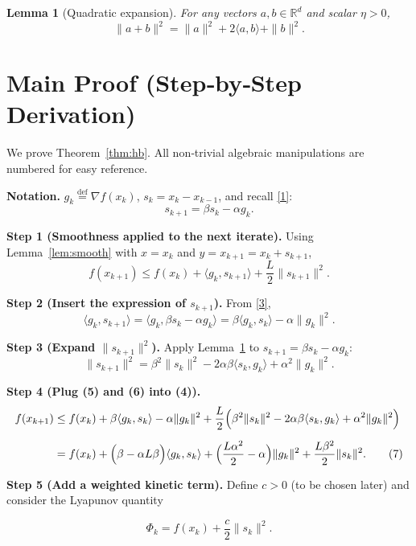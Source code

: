 \documentclass{article}
\newtheorem{lemma}{Lemma}
\newcommand{\R}{\mathbb{R}}
\begin{document}
\begin{lemma}[Quadratic expansion]\label{lem:expansion}
For any vectors $a,b\in\R^{d}$ and scalar $\eta>0$,
\[
\|a+b\|^{2}= \|a\|^{2}+2\langle a,b\rangle+\|b\|^{2}. 
\]
\end{lemma}

\section*{Main Proof (Step‑by‑Step Derivation)}
We prove Theorem~\ref{thm:hb}. All non‑trivial algebraic manipulations are numbered for easy reference.

\medskip
\noindent\textbf{Notation.} $g_{k}\stackrel{\text{def}}{=}\nabla f(x_{k})$, $s_{k}=x_{k}-x_{k-1}$, and recall \eqref{1}:
\[
s_{k+1}= \beta s_{k}-\alpha g_{k}. \tag{3}
\]

\medskip
\noindent\textbf{Step 1 (Smoothness applied to the next iterate).}  
Using Lemma~\ref{lem:smooth} with $x=x_{k}$ and $y=x_{k+1}=x_{k}+s_{k+1}$,
\[
f(x_{k+1})\le f(x_{k})+\langle g_{k},s_{k+1}\rangle+\frac{L}{2}\|s_{k+1}\|^{2}. \tag{4}
\]

\noindent\textbf{Step 2 (Insert the expression of $s_{k+1}$).}  
From \eqref{3},
\[
\langle g_{k},s_{k+1}\rangle
 =\langle g_{k},\beta s_{k}-\alpha g_{k}\rangle
 =\beta\langle g_{k},s_{k}\rangle-\alpha\|g_{k}\|^{2}. \tag{5}
\]

\noindent\textbf{Step 3 (Expand $\|s_{k+1}\|^{2}$).}  
Apply Lemma~\ref{lem:expansion} to $s_{k+1}= \beta s_{k}-\alpha g_{k}$:
\[
\|s_{k+1}\|^{2}= \beta^{2}\|s_{k}\|^{2}-2\alpha\beta\langle s_{k},g_{k}\rangle+\alpha^{2}\|g_{k}\|^{2}. \tag{6}
\]

\noindent\textbf{Step 4 (Plug (5) and (6) into (4)).}  
\[
\begin{aligned}
f(x_{k+1}) 
&\le f(x_{k})+\beta\langle g_{k},s_{k}\rangle-\alpha\|g_{k}\|^{2}
   +\frac{L}{2}\Bigl(\beta^{2}\|s_{k}\|^{2}
        -2\alpha\beta\langle s_{k},g_{k}\rangle
        +\alpha^{2}\|g_{k}\|^{2}\Bigr)\\[2mm]
&= f(x_{k}) 
   +\Bigl(\beta-\alpha L\beta\Bigr)\langle g_{k},s_{k}\rangle
   +\Bigl(\frac{L\alpha^{2}}{2}-\alpha\Bigr)\|g_{k}\|^{2}
   +\frac{L\beta^{2}}{2}\|s_{k}\|^{2}. \tag{7}
\end{aligned}
\]

\noindent\textbf{Step 5 (Add a weighted kinetic term).}  
Define $c>0$ (to be chosen later) and consider the Lyapunov quantity  

\[
\Phi_{k}=f(x_{k})+\frac{c}{2}\|s_{k}\|^{2}. \tag{8}
\]
\end{document}
